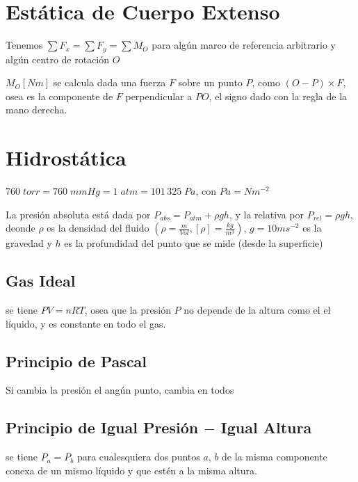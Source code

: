 \documentclass[a4paper]{article}
\begin{document}
\section{Estática de Cuerpo Extenso}
Tenemos $\sum F_x = \sum F_y = \sum M_O$ para algún marco de referencia
arbitrario y algún centro de rotación $O$

$M_O[Nm]$ se calcula dada una fuerza $F$ sobre un punto $P$, como $(O - P)
\times F$, osea es la componente de $F$ perpendicular a $PO$, el signo dado
con la regla de la mano derecha.
\section{Hidrostática}
\(
	760\;torr = 760\;mmHg = 1\;atm = 101\,325\;Pa
\), con \(
Pa = Nm^{-2}
\)

La presión absoluta está dada por $P_{abs} = P_{atm} + \rho gh$, y la
relativa por $P_{rel} = \rho gh$, deonde $\rho$ es la densidad del fluido
$\left(\rho = \frac{m}{Vol}, [\rho] = \frac{kg}{m^3}\right)$, $g =
10ms^{-2}$ es la gravedad y $h$ es la profundidad del punto que se mide
(desde la superficie)
\subsection{Gas Ideal}
se tiene $PV = nRT$, osea que la presión $P$ no depende de la altura como el
el líquido, y es constante en todo el gas.
\subsection{Principio de Pascal}
Si cambia la presión el angún punto, cambia en todos
\subsection{Principio de Igual Presión $-$ Igual Altura}
se tiene $P_a = P_b$ para cualesquiera dos puntos $a$, $b$ de la misma
componente conexa de un mismo líquido y que estén a la misma altura.
\end{document}
